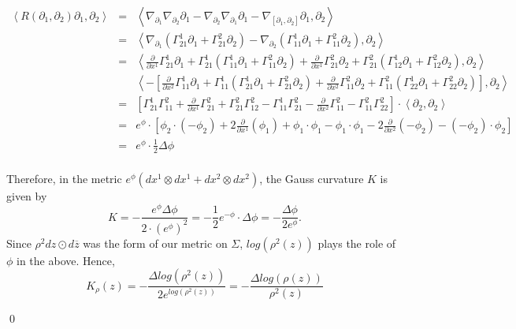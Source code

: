 \documentclass{article}
\newcommand{\tensor}[0]{\otimes}
\newcommand{\proven}[0]{\begin{flushright} \qed \end{flushright}}
\newcommand{\dzbar}[0]{d\overline{z}}
\newcommand{\christoffel}[3]{\Gamma _{#1 #2} ^{#3}}
\begin{document}
\begin{eqnarray*}
\left\langle R(\partial_1,\partial_2) \partial_1, \partial_2\right\rangle  & = & \left\langle \nabla _{\partial_1} \nabla _{\partial_2} \partial_1 - \nabla _{\partial_2} \nabla _{\partial_1} \partial_1 - \nabla _{[\partial_1, \partial_2]} \partial_1 , \partial_2\right\rangle \\
  & = & \left\langle \nabla _{\partial_1} \left( \christoffel{2}{1}{1} \partial_1 + \christoffel {2}{1}{2} \partial_2 \right) - \nabla _{\partial_2} \left( \christoffel{1}{1}{1} \partial_1 + \christoffel {1}{1}{2} \partial_2 \right), \partial_2\right\rangle \\
  & = & \left\langle \frac{\partial}{\partial x^1} \christoffel{2}{1}{1}\partial_1 +
\christoffel{2}{1}{1}\left( \christoffel{1}{1}{1}\partial_1 + \christoffel{1}{1}{2}\partial_2 \right) + \frac{\partial}{\partial x^1} \christoffel{2}{1}{2}\partial_2 + \christoffel{2}{1}{2}\left( \christoffel{1}{2}{1}\partial_1 + \christoffel{1}{2}{2}\partial_2 \right), \partial_2\right\rangle  \\
 & & \left\langle - \left[ \frac{\partial }{\partial x^2} \christoffel{1}{1}{1}\partial_1 + \christoffel{1}{1}{1}\left( \christoffel{2}{1}{1}\partial_1 + \christoffel{2}{1}{2}\partial_2 \right) +
\frac{\partial}{\partial x^2} \christoffel{1}{1}{2}\partial_2 + \christoffel{1}{1}{2}\left( \christoffel{2}{2}{1}\partial_1 + \christoffel{2}{2}{2}\partial_2 \right) \right] ,\partial_2 \right\rangle \\
 & = & \left[ \christoffel{2}{1}{1}\christoffel{1}{1}{2} + \frac{\partial}{\partial x^1} \christoffel{2}{1}{2} +
\christoffel{2}{1}{2}\christoffel{1}{2}{2} - \christoffel{1}{1}{1}\christoffel{2}{1}{2} -
\frac{\partial}{\partial x^2} \christoffel{1}{1}{2} - \christoffel{1}{1}{2}\christoffel{2}{2}{2} \right] \cdot \left\langle \partial_2 , \partial_2 \right\rangle \\
 & = & e^\phi \cdot \left[ \phi_2 \cdot ( - \phi_2 ) + 2 \frac{\partial}{\partial x^1}(\phi _1) + \phi _1 \cdot \phi _1 - \phi _1 \cdot \phi _1 -2\frac{\partial}{\partial x^2}(- \phi _2) - (-\phi_2)\cdot \phi _2 \right]\\
 & = & e^\phi \cdot \frac{1}{2} \Delta \phi \\
\end{eqnarray*}

Therefore, in the metric $e^\phi (dx ^1 \tensor dx ^1 + dx^2 \tensor dx^2)$, the Gauss curvature $K$ is given by
$$K = -\frac{e^\phi \Delta \phi}{2\cdot (e^\phi)^2} = - \frac{1}{2} e^{-\phi} \cdot \Delta \phi = -\frac{\Delta \phi}{2 e^\phi}.$$
Since $\rho ^2 dz \odot \dzbar$ was the form of our metric on $\Sigma$, $log(\rho ^2(z))$ plays the role of $\phi$ in the above. Hence, $$K_\rho (z) = -\frac{\Delta log (\rho ^2 (z))}{2 e^{log(\rho^2(z))}} = -\frac{\Delta log (\rho (z))}{\rho ^2 (z)}$$
\proven
\end{document}
